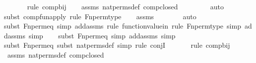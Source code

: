 \begin{isabellebody}
\ \ \ \ \ \ \isamarkupfalse%
{\isacharparenleft}{\kern0pt}rule\ comp{\isacharunderscore}{\kern0pt}bij{\isacharparenright}{\kern0pt}\isanewline
\ \ \isamarkupfalse%
\ assms\ nat{\isacharunderscore}{\kern0pt}perms{\isacharunderscore}{\kern0pt}def\ comp{\isacharunderscore}{\kern0pt}closed\ \isanewline
\ \ \ \ \ \ \isamarkupfalse%
\ auto{\isacharbrackleft}{\kern0pt}{}{\isacharbrackright}{\kern0pt}\isanewline
\ \ \ \isamarkupfalse%
{\isacharparenleft}{\kern0pt}subst\ comp{\isacharunderscore}{\kern0pt}fun{\isacharunderscore}{\kern0pt}apply{\isacharcomma}{\kern0pt}\ rule\ Fn{\isacharunderscore}{\kern0pt}perm{\isacharprime}{\kern0pt}{\isacharunderscore}{\kern0pt}type{\isacharparenright}{\kern0pt}\isanewline
\ \ \isamarkupfalse%
\ assms\ \isanewline
\ \ \ \ \ \isamarkupfalse%
\ auto{\isacharbrackleft}{\kern0pt}{}{\isacharbrackright}{\kern0pt}\isanewline
\ \ \ \isamarkupfalse%
{\isacharparenleft}{\kern0pt}subst\ Fn{\isacharunderscore}{\kern0pt}perm{\isacharprime}{\kern0pt}{\isacharunderscore}{\kern0pt}eq{\isacharcomma}{\kern0pt}\ simp\ add{\isacharcolon}{\kern0pt}assms{\isacharcomma}{\kern0pt}\ rule\ function{\isacharunderscore}{\kern0pt}value{\isacharunderscore}{\kern0pt}in{\isacharcomma}{\kern0pt}\ rule\ Fn{\isacharunderscore}{\kern0pt}perm{\isacharprime}{\kern0pt}{\isacharunderscore}{\kern0pt}type{\isacharcomma}{\kern0pt}\ simp\ add{\isacharcolon}{\kern0pt}assms{\isacharcomma}{\kern0pt}\ simp{\isacharparenright}{\kern0pt}\isanewline
\ \ \ \isamarkupfalse%
{\isacharparenleft}{\kern0pt}subst\ Fn{\isacharunderscore}{\kern0pt}perm{\isacharprime}{\kern0pt}{\isacharunderscore}{\kern0pt}eq{\isacharcomma}{\kern0pt}\ simp\ add{\isacharcolon}{\kern0pt}assms{\isacharcomma}{\kern0pt}\ simp{\isacharparenright}{\kern0pt}\isanewline
\ \ \ \isamarkupfalse%
{\isacharparenleft}{\kern0pt}subst\ Fn{\isacharunderscore}{\kern0pt}perm{\isacharprime}{\kern0pt}{\isacharunderscore}{\kern0pt}eq{\isacharcomma}{\kern0pt}\ subst\ nat{\isacharunderscore}{\kern0pt}perms{\isacharunderscore}{\kern0pt}def{\isacharcomma}{\kern0pt}\ simp\ {\isacharcomma}{\kern0pt}rule\ conjI{\isacharparenright}{\kern0pt}\isanewline
\ \ \ \ \ \ \isamarkupfalse%
{\isacharparenleft}{\kern0pt}rule\ comp{\isacharunderscore}{\kern0pt}bij{\isacharparenright}{\kern0pt}\isanewline
\ \ \isamarkupfalse%
\ assms\ nat{\isacharunderscore}{\kern0pt}perms{\isacharunderscore}{\kern0pt}def\ comp{\isacharunderscore}{\kern0pt}closed\ \isanewline

\end{isabellebody}
